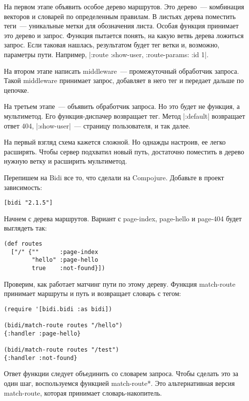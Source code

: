 На первом этапе объявить особое дерево маршрутов. Это дерево~--- комбинация
векторов и словарей по определенным правилам. В листьях дерева поместить теги~---
уникальные метки для обозначения листа. Особая функция принимает это дерево и
запрос. Функция пытается понять, на какую ветвь дерева ложиться запрос. Если
таковая нашлась, результатом будет тег ветки и, возможно, параметры
пути. Например, \spverb|{:route :show-user, :route-params: {:id 1}}|.

На втором этапе написать middleware~--- промежуточный обработчик запроса. Такой
middleware принимает запрос, добавляет в него тег и передает дальше по цепочке.

На третьем этапе~--- объявить обработчик запроса. Но это будет не функция, а
мультиметод. Его функция-диспачер возвращает тег. Метод \spverb|:default| возвращает
ответ 404, \spverb|:show-user|~--- страницу пользователя, и так далее.

На первый взгляд схема кажется сложной. Но однажды настроив, ее легко
расширять. Чтобы сервер подхватил новый путь, достаточно поместить в дерево
нужную ветку и расширить мультиметод.

Перепишем на Bidi все то, что сделали на Compojure. Добавьте в проект
зависимость:

\begin{verbatim}
[bidi "2.1.5"]
\end{verbatim}

Начнем с дерева маршрутов. Вариант с page-index, page-hello и page-404 будет выглядеть так:

\begin{verbatim}
(def routes
  ["/" {""      :page-index
        "hello" :page-hello
        true    :not-found}])
\end{verbatim}

Проверим, как работает матчинг пути по этому дереву. Функция match-route
принимает маршруты и путь и возвращает словарь с тегом:

\begin{verbatim}
(require '[bidi.bidi :as bidi])

(bidi/match-route routes "/hello")
{:handler :page-hello}

(bidi/match-route routes "/test")
{:handler :not-found}
\end{verbatim}

Ответ функции следует объединить со словарем запроса. Чтобы сделать это за один
шаг, воспользуемся функцией match-route*. Это альтернативная версия match-route,
которая принимает словарь-накопитель.

